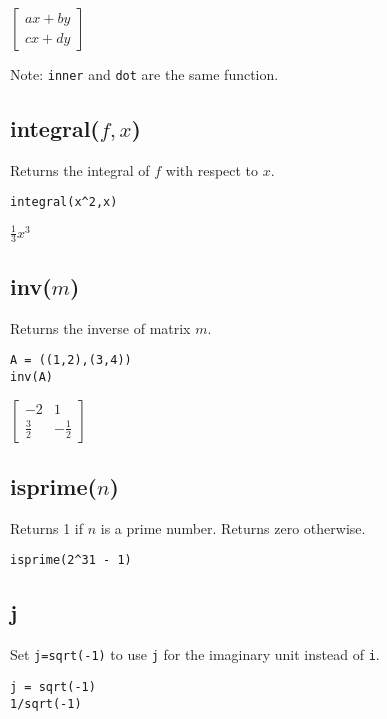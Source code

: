 \noindent
$\displaystyle
\begin{bmatrix}
ax+by\\
cx+dy
\end{bmatrix}
$

\bigskip
\noindent
Note: {\tt inner} and {\tt dot} are the same function.

\subsection*{integral($f,x$)}

Returns the integral of $f$ with respect to $x$.

{\color{blue}
\begin{verbatim}
integral(x^2,x)
\end{verbatim}
}

\noindent
$\displaystyle \tfrac{1}{3}x^3$

\subsection*{inv($m$)}

Returns the inverse of matrix $m$.

{\color{blue}
\begin{verbatim}
A = ((1,2),(3,4))
inv(A)
\end{verbatim}
}

\noindent
$\displaystyle
\begin{bmatrix}
-2 & 1\\
\tfrac{3}{2} & -\tfrac{1}{2}
\end{bmatrix}
$

\subsection*{isprime($n$)}

Returns 1 if $n$ is a prime number. Returns zero otherwise.

{\color{blue}
\begin{verbatim}
isprime(2^31 - 1)
\end{verbatim}
}


\subsection*{j}

Set {\tt j=sqrt(-1)} to use {\tt j} for the imaginary unit instead of {\tt i}.

{\color{blue}
\begin{verbatim}
j = sqrt(-1)
1/sqrt(-1)
\end{verbatim}
}


